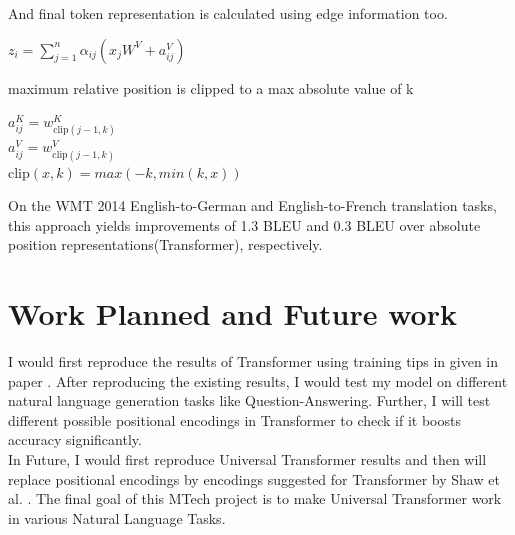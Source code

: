 \documentclass{article}
\begin{document}
\begin{multicols}{2}
\begin{itemize}
  \noindent And final token representation is calculated using edge information too.
   \begin{center}
      $z_i = \sum_{j=1}^{n} \alpha _{ij}(x_jW^V+a_{ij}^V)$
   \end{center}
   maximum relative position is clipped to a max absolute value of k
 \begin{center}
      $ a_{ij}^K = w_{\text{clip}(j-1,k)}^K$\\
       $ a_{ij}^V = w_{\text{clip}(j-1,k)}^V$\\
       $ \text{clip}(x,k) = max(-k, min(k,x))$
   \end{center}
   On the WMT 2014 English-to-German and English-to-French translation tasks, this approach yields improvements of 1.3 BLEU and 0.3 BLEU over absolute position representations(Transformer), respectively.
\end{itemize}

\section{Work Planned and Future work}
I would first reproduce the results of Transformer using training tips in given in paper \cite{DBLP:journals/corr/abs-1804-00247}. After reproducing the existing results, I would test my model on different natural language generation tasks like Question-Answering. Further, I will test different possible positional encodings in Transformer to check if it boosts accuracy significantly. \\
In Future, I would first reproduce Universal Transformer results and then will replace positional encodings by encodings suggested for Transformer by Shaw et al. \cite{shaw2018selfattention}.
The final goal of this MTech project is to make Universal Transformer work in various Natural Language Tasks.
    
    
    
    
    \end{multicols}
\end{document}
